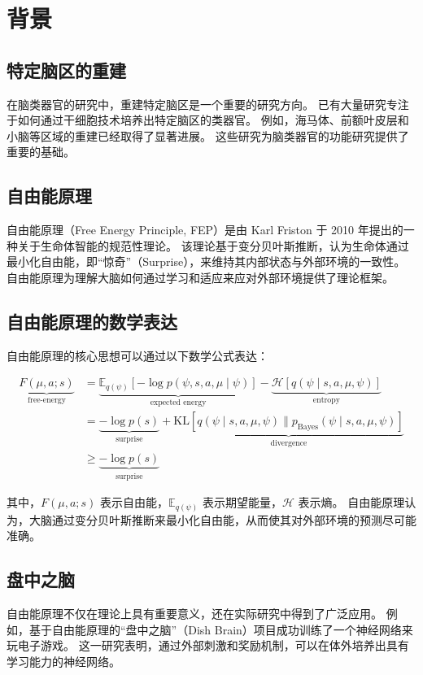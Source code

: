 \chapter{背景}\label{chap:background}

\section{特定脑区的重建}\label{sec:brain-region-reconstruction}
在脑类器官的研究中，重建特定脑区是一个重要的研究方向\cite{Kim2023}。
已有大量研究专注于如何通过干细胞技术培养出特定脑区的类器官。
例如，海马体、前额叶皮层和小脑等区域的重建已经取得了显著进展。
这些研究为脑类器官的功能研究提供了重要的基础。


\section{自由能原理}\label{sec:free-energy-principle}
自由能原理（Free Energy Principle, FEP）是由 Karl Friston 于 2010 年提出的一种关于生命体智能的规范性理论\cite{Friston2010}。
该理论基于变分贝叶斯推断，认为生命体通过最小化自由能，即“惊奇”（Surprise），来维持其内部状态与外部环境的一致性。
自由能原理为理解大脑如何通过学习和适应来应对外部环境提供了理论框架。


\section{自由能原理的数学表达}\label{sec:free-energy-math}
自由能原理的核心思想可以通过以下数学公式表达：

\[
    \begin{aligned}
        \underbrace{F(\mu, a; s)}_{\text{free-energy}} & = \underbrace{\mathbb{E}_{q(\psi)} \left[ -\log p(\psi, s, a, \mu \mid \psi) \right]}_{\text{expected energy}} - \underbrace{\mathcal{H}[q(\psi \mid s, a, \mu, \psi)]}_{\text{entropy}} \\
                                                       & = \underbrace{-\log p(s)}_{\text{surprise}} + \underbrace{\text{KL}[q(\psi \mid s, a, \mu, \psi) \parallel p_{\text{Bayes}}(\psi \mid s, a, \mu, \psi)]}_{\text{divergence}}             \\
                                                       & \geq \underbrace{-\log p(s)}_{\text{surprise}}
    \end{aligned}
\]

其中，$F(\mu, a; s)$ 表示自由能，$\mathbb{E}_{q(\psi)}$ 表示期望能量，$\mathcal{H}$ 表示熵。
自由能原理认为，大脑通过变分贝叶斯推断来最小化自由能，从而使其对外部环境的预测尽可能准确。


\section{盘中之脑}\label{sec:dish-brain}
自由能原理不仅在理论上具有重要意义，还在实际研究中得到了广泛应用。
例如，基于自由能原理的“盘中之脑”（Dish Brain）项目成功训练了一个神经网络来玩电子游戏\cite{Kagan2022}。
这一研究表明，通过外部刺激和奖励机制，可以在体外培养出具有学习能力的神经网络。



